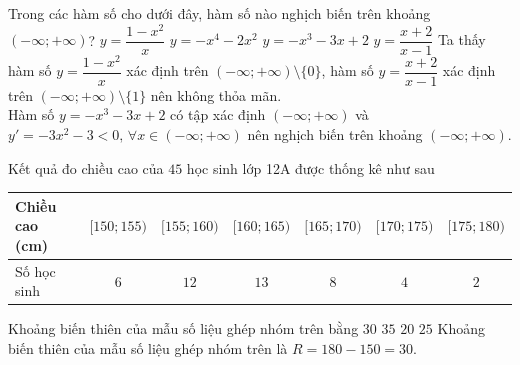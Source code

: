 \begin{ex}%
	Trong các hàm số cho dưới đây, hàm số nào nghịch biến trên khoảng $(-\infty;+\infty)$?
	\choice
	{$y=\dfrac{1-x^2}{x}$}
	{$y=-x^4-2x^2$}
	{\True $y=-x^3-3x+2$}
	{$y=\dfrac{x+2}{x-1}$}
	\loigiai
	{Ta thấy hàm số $y=\dfrac{1-x^2}{x}$ xác định trên $(-\infty;+\infty)\setminus \{0\}$, hàm số $y=\dfrac{x+2}{x-1}$ xác định trên $(-\infty;+\infty)\setminus \{1\}$ nên không thỏa mãn.\\
		Hàm số $y=-x^3-3x+2$ có tập xác định $(-\infty;+\infty)$ và $y'=-3x^2-3<0,\, \forall x\in (-\infty;+\infty)$ nên nghịch biến trên khoảng $(-\infty;+\infty)$.}
\end{ex}

\begin{ex}%
	Kết quả đo chiều cao của $45$ học sinh lớp 12A được thống kê như sau
	\begin{center}
		{\setlength\extrarowheight{2pt}
			\begin{tabular}{|>{\centering\arraybackslash}m{3.5cm}|*{6}{c|}}
				\hline 
				Chiều cao (cm)	& $[150;155)$ & $[155;160)$ & $[160;165)$ & $[165;170)$ & $[170;175)$ & $[175;180)$\\
				\hline 
				Số học sinh	& $6$ & $12$ & $13$ & $8$ & $4$ & $2$\\
				\hline 
		\end{tabular}}
	\end{center}
	Khoảng biến thiên của mẫu số liệu ghép nhóm trên bằng
	\choice
	{\True $30$}
	{$35$}
	{$20$}
	{$25$}
	\loigiai
	{Khoảng biến thiên của mẫu số liệu ghép nhóm trên là $R=180-150=30$.}
\end{ex}
\cauds
